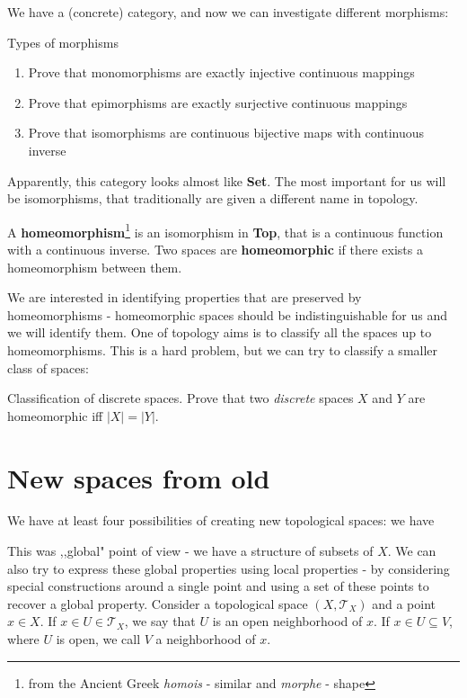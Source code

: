 We have a (concrete) category, and now we can investigate different morphisms:

\begin{exercise}
  Types of morphisms
  \begin{enumerate}
    \item Prove that monomorphisms are exactly injective continuous mappings
    \item Prove that epimorphisms are exactly surjective continuous mappings
    \item Prove that isomorphisms are continuous bijective maps with continuous inverse
  \end{enumerate}
\end{exercise}

Apparently, this category looks almost like \textbf{Set}.
The most important for us will be isomorphisms, that traditionally are given a different name in topology.

\begin{definition}
  A \textbf{homeomorphism}\footnote{from the Ancient Greek \textit{homois} - similar and \textit{morphe} - shape} is an isomorphism in \textbf{Top}, that is a continuous function with a continuous inverse. Two spaces are \textbf{homeomorphic} if there exists a homeomorphism between them.
\end{definition}

We are interested in identifying properties that are preserved by homeomorphisms - homeomorphic spaces should be indistinguishable for us and we will identify them. One of topology aims is to classify all the spaces up to homeomorphisms. This is a hard problem, but we can try to classify a smaller class of spaces:

\begin{exercise}
  Classification of discrete spaces.
  Prove that two \textit{discrete} spaces $X$ and $Y$ are homeomorphic iff $|X|=|Y|.$
\end{exercise}

\section{New spaces from old}
We have at least four possibilities of creating new topological spaces: we have 


This was ,,global" point of view - we have a structure of subsets of $X$. We can also try to express these global properties using local
properties - by considering special constructions around a single point and using a set of these points to recover a global property.
Consider a topological space $(X,\mathcal T_X)$ and a point $x\in X$.
If $x\in U\in \mathcal T_X$, we say that $U$ is an open neighborhood
of $x$. If $x\in U\subseteq V$, where $U$ is open, we call $V$ a
neighborhood of $x$.

